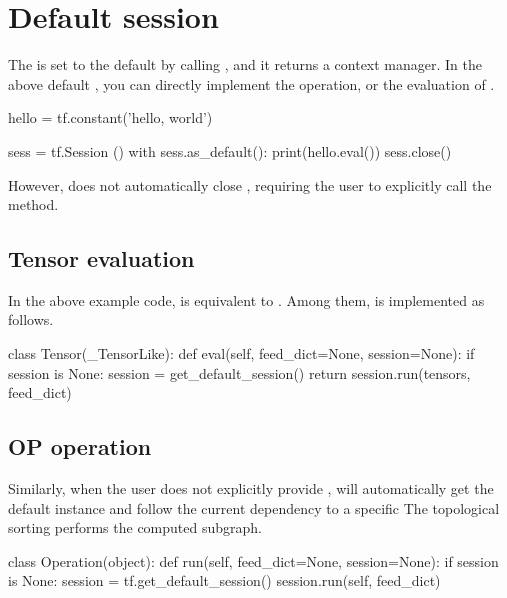 \section{Default session}
\begin{content}
The  is set to the default  by calling , and it returns a context manager. In the above default , you can directly implement the  operation, or the evaluation of .

\begin{leftbar}
\begin{python}
hello = tf.constant('hello, world')

sess = tf.Session ()  
with sess.as_default():
  print(hello.eval())
sess.close()
\end{python}
\end{leftbar}

However,  does not automatically close , requiring the user to explicitly call the  method.


\subsection{Tensor evaluation}
In the above example code,  is equivalent to . Among them,  is implemented as follows.

\begin{leftbar}
\begin{python}
class Tensor(_TensorLike):
  def eval(self, feed_dict=None, session=None):
    if session is None:
      session = get_default_session()
    return session.run(tensors, feed_dict)
\end{python}
\end{leftbar}


\subsection{OP operation}
Similarly, when the user does not explicitly provide ,  will automatically get the default  instance and follow the current  dependency to a specific The topological sorting performs the computed subgraph.

\begin{leftbar}
\begin{python}
class Operation(object):
  def run(self, feed_dict=None, session=None):
    if session is None:
      session = tf.get_default_session()
    session.run(self, feed_dict)
\end{python}
\end{leftbar}



\end{content}
